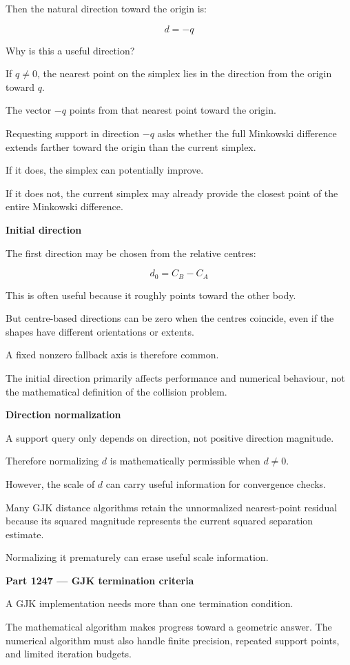 Then the natural direction toward the origin is:

\[
\boxed{ d=-q }
\]

Why is this a useful direction?

If \(q\ne0\), the nearest point on the simplex lies in the direction from the origin toward \(q\).

The vector \(-q\) points from that nearest point toward the origin.

Requesting support in direction \(-q\) asks whether the full Minkowski difference extends farther toward the origin than the current simplex.

If it does, the simplex can potentially improve.

If it does not, the current simplex may already provide the closest point of the entire Minkowski difference.

\textbf{Initial direction}

The first direction may be chosen from the relative centres:

\[
d_0=C_B-C_A
\]

This is often useful because it roughly points toward the other body.

But centre-based directions can be zero when the centres coincide, even if the shapes have different orientations or extents.

A fixed nonzero fallback axis is therefore common.

The initial direction primarily affects performance and numerical behaviour, not the mathematical definition of the collision problem.

\textbf{Direction normalization}

A support query only depends on direction, not positive direction magnitude.

Therefore normalizing \(d\) is mathematically permissible when \(d\ne0\).

However, the scale of \(d\) can carry useful information for convergence checks.

Many GJK distance algorithms retain the unnormalized nearest-point residual because its squared magnitude represents the current squared separation estimate.

Normalizing it prematurely can erase useful scale information.

\textbf{Part 1247 --- GJK termination criteria}

A GJK implementation needs more than one termination condition.

The mathematical algorithm makes progress toward a geometric answer. The numerical algorithm must also handle finite precision, repeated support points, and limited iteration budgets.

